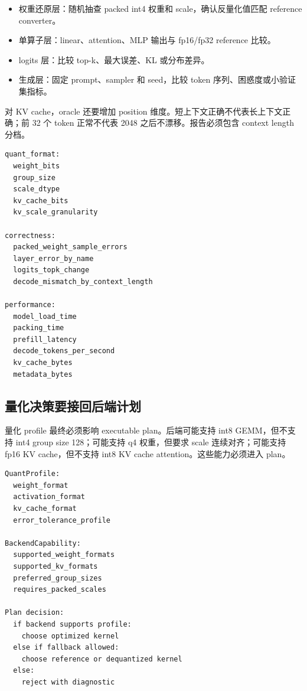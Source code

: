 \begin{itemize}
  \item 权重还原层：随机抽查 packed int4 权重和 scale，确认反量化值匹配 reference converter。
  \item 单算子层：linear、attention、MLP 输出与 fp16/fp32 reference 比较。
  \item logits 层：比较 top-k、最大误差、KL 或分布差异。
  \item 生成层：固定 prompt、sampler 和 seed，比较 token 序列、困惑度或小验证集指标。
\end{itemize}

对 KV cache，oracle 还要增加 position 维度。短上下文正确不代表长上下文正确；前 32 个 token 正常不代表 2048 之后不漂移。报告必须包含 context length 分档。

\begin{lstlisting}[numbers=none,caption={低比特量化验收报告字段}]
quant_format:
  weight_bits
  group_size
  scale_dtype
  kv_cache_bits
  kv_scale_granularity

correctness:
  packed_weight_sample_errors
  layer_error_by_name
  logits_topk_change
  decode_mismatch_by_context_length

performance:
  model_load_time
  packing_time
  prefill_latency
  decode_tokens_per_second
  kv_cache_bytes
  metadata_bytes
\end{lstlisting}

\subsection{量化决策要接回后端计划}

量化 profile 最终必须影响 executable plan。后端可能支持 int8 GEMM，但不支持 int4 group size 128；可能支持 q4 权重，但要求 scale 连续对齐；可能支持 fp16 KV cache，但不支持 int8 KV cache attention。这些能力必须进入 plan。

\begin{lstlisting}[numbers=none,caption={量化 profile 与后端选择}]
QuantProfile:
  weight_format
  activation_format
  kv_cache_format
  error_tolerance_profile

BackendCapability:
  supported_weight_formats
  supported_kv_formats
  preferred_group_sizes
  requires_packed_scales

Plan decision:
  if backend supports profile:
    choose optimized kernel
  else if fallback allowed:
    choose reference or dequantized kernel
  else:
    reject with diagnostic
\end{lstlisting}

